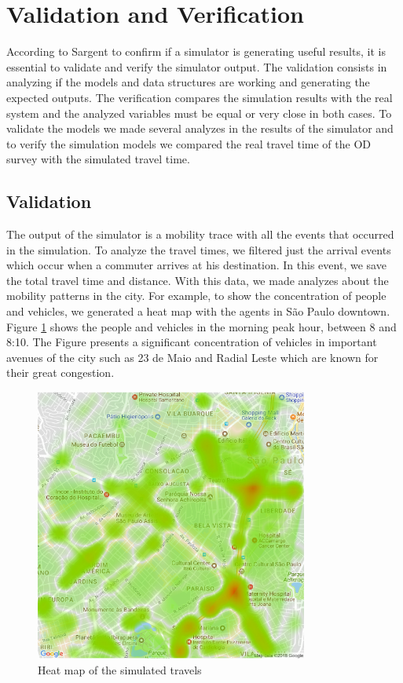 \section{Validation and Verification}

According to Sargent \citep{sargent2013verification} to confirm if a simulator is generating useful results, it is essential to validate and verify the simulator output. The validation consists in analyzing if the models and data structures are working and generating the expected outputs. The verification compares the simulation results with the real system and the analyzed variables must be equal or very close in both cases. To validate the models we made several analyzes in the results of the simulator and to verify the simulation models we compared the real travel time of the OD survey with the simulated travel time. 

\subsection{Validation}

The output of the simulator is a mobility trace with all the events that occurred in the simulation. To analyze the travel times, we filtered just the arrival events which occur when a commuter arrives at his destination. In this event, we save the total travel time and distance. With this data, we made analyzes about the mobility patterns in the city. For example, to show the concentration of people and vehicles, we generated a heat map with the agents in S\~ao Paulo downtown. Figure \ref{fig:heat_map} shows the people and vehicles in the morning peak hour, between 8 and 8:10. The Figure presents a significant concentration of vehicles in important avenues of the city such as 23 de Maio and Radial Leste which are known for their great congestion.

\begin{figure}[!htb]
\centering
\includegraphics[width=0.8\textwidth]{figuras/chap-sp/mapa_calor.pdf}
\caption{Heat map of the simulated travels}
\label{fig:heat_map}
\end{figure}

